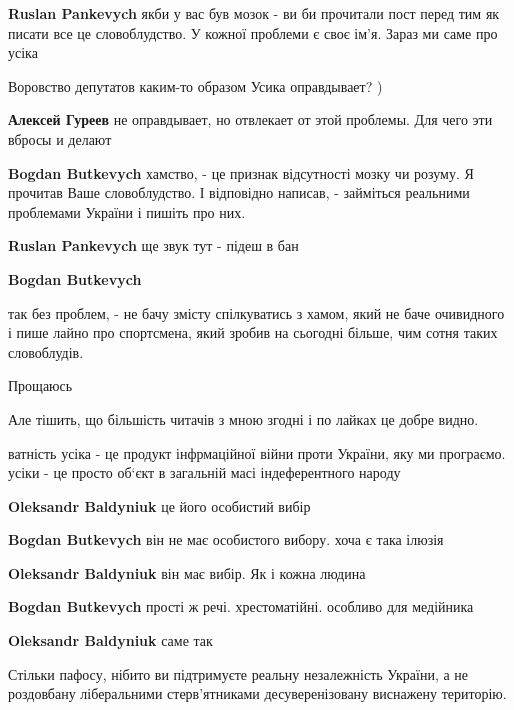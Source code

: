 \begin{itemize}
\begin{itemize}
\textbf{Ruslan Pankevych} якби у вас був мозок - ви би прочитали пост перед тим як писати все це словоблудство. У кожної проблеми є своє ім'я. Зараз ми саме про усіка

Воровство депутатов каким-то образом Усика оправдывает? )

\textbf{Алексей Гуреев} не оправдывает, но отвлекает от этой проблемы. Для чего эти вбросы и делают

\textbf{Bogdan Butkevych} хамство, - це признак відсутності мозку чи розуму.
Я прочитав Ваше словоблудство. І відповідно написав, - займіться реальними проблемами України і пишіть про них.

\textbf{Ruslan Pankevych} ще звук тут - підеш в бан

\textbf{Bogdan Butkevych} 

так без проблем, - не бачу змісту спілкуватись з хамом, який не баче очивидного
і пише лайно про спортсмена, який зробив на сьогодні більше, чим сотня таких
словоблудів.

Прощаюсь

Але тішить, що більшість читачів з мною згодні і по лайках це добре видно.

\end{itemize} %


ватність усіка - це продукт інфрмаційної війни проти України, яку ми програємо.
усіки - це просто об‘єкт в загальній масі індеферентного народу

\begin{itemize} %
\textbf{Oleksandr Baldyniuk} це його особистий вибір

\textbf{Bogdan Butkevych} він не має особистого вибору. хоча є така ілюзія


\textbf{Oleksandr Baldyniuk} він має вибір. Як і кожна людина

\textbf{Bogdan Butkevych} прості ж речі. хрестоматійні. особливо для медійника

\textbf{Oleksandr Baldyniuk} саме так
\end{itemize} %


Стільки пафосу, нібито ви підтримуєте реальну незалежність України, а не
роздовбану ліберальними стерв'ятниками десуверенізовану виснажену територію.


\end{itemize}
